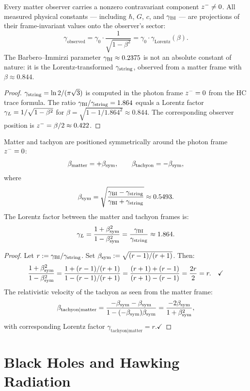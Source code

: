 \begin{theorem}\label{thm:frame-offset}
Every matter observer carries a nonzero contravariant component
$z^-\neq 0$.
All measured physical constants --- including $\hbar$, $G$, $c$, and
$\gamma_{\mathrm{BI}}$ --- are projections of their frame-invariant values onto the
observer's sector:
\[
  \gamma_{\mathrm{observed}}
  = \gamma_0\cdot\frac{1}{\sqrt{1-\beta^2}}
  = \gamma_0\cdot\gamma_{\mathrm{Lorentz}}(\beta).
\]
The Barbero--Immirzi parameter $\gamma_{\mathrm{BI}}\approx 0.2375$ is not an absolute
constant of nature: it is the Lorentz-transformed $\gamma_{\mathrm{string}}$, observed
from a matter frame with $\beta\approx 0.844$.
\end{theorem}

\begin{proof}
$\gamma_{\mathrm{string}} = \ln 2/(\pi\sqrt{3})$ is computed in the photon frame
$z^-=0$ from the HC trace formula.
The ratio $\gamma_{\mathrm{BI}}/\gamma_{\mathrm{string}} = 1.864$ equals a Lorentz factor
$\gamma_L = 1/\sqrt{1-\beta^2}$ for $\beta=\sqrt{1-1/1.864^2}\approx 0.844$.
The corresponding observer position is $z^-=\beta/2\approx 0.422$.
\end{proof}

\begin{theorem}\label{thm:symmetric-frame}
Matter and tachyon are positioned symmetrically around the photon frame
$z^-=0$:
\[
  \beta_{\mathrm{matter}} = +\beta_{\mathrm{sym}},\qquad
  \beta_{\mathrm{tachyon}} = -\beta_{\mathrm{sym}},
\]
where
\[
  \beta_{\mathrm{sym}} = \sqrt{\frac{\gamma_{\mathrm{BI}}-\gamma_{\mathrm{string}}}{\gamma_{\mathrm{BI}}+\gamma_{\mathrm{string}}}}\approx 0.5493.
\]
The Lorentz factor between the matter and tachyon frames is:
\[
  \gamma_L = \frac{1+\beta_{\mathrm{sym}}^2}{1-\beta_{\mathrm{sym}}^2}
      = \frac{\gamma_{\mathrm{BI}}}{\gamma_{\mathrm{string}}}\approx 1.864.
\]
\end{theorem}

\begin{proof}
Let $r:=\gamma_{\mathrm{BI}}/\gamma_{\mathrm{string}}$. Set $\beta_{\mathrm{sym}}:=\sqrt{(r-1)/(r+1)}$. Then:
\[
  \frac{1+\beta_{\mathrm{sym}}^2}{1-\beta_{\mathrm{sym}}^2}
  =\frac{1+(r-1)/(r+1)}{1-(r-1)/(r+1)}
  =\frac{(r+1)+(r-1)}{(r+1)-(r-1)}=\frac{2r}{2}=r.\quad\checkmark
\]
The relativistic velocity of the tachyon as seen from the matter frame:
\[
  \beta_{\mathrm{tachyon}|\mathrm{matter}}
  =\frac{-\beta_{\mathrm{sym}}-\beta_{\mathrm{sym}}}{1-(-\beta_{\mathrm{sym}})\beta_{\mathrm{sym}}}
  =\frac{-2\beta_{\mathrm{sym}}}{1+\beta_{\mathrm{sym}}^2},
\]
with corresponding Lorentz factor $\gamma_{\mathrm{tachyon}|\mathrm{matter}}=r$.\quad$\checkmark$
\end{proof}



\section{Black Holes and Hawking Radiation}
\label{sec:bh}

